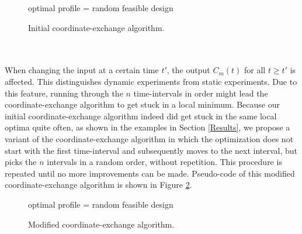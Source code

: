 \begin{figure}
	
	\begin{algorithm}[H]
		optimal profile = random feasible design\;
		
	\end{algorithm}
	
	\caption{Initial coordinate-exchange algorithm.}
	\label{pseudo1}
\end{figure}
\\
\\
When changing the input at a certain time $t'$, the output $C_m(t)$ for all $t\geq t'$ is affected. This distinguishes dynamic experiments from static experiments. Due to this feature, running through the $n$ time-intervals in order might lead the coordinate-exchange algorithm to get stuck in a local minimum. Because our initial coordinate-exchange algorithm indeed did get stuck in the same local optima quite often, as shown in the examples in Section \ref{Results}, we propose a variant of the coordinate-exchange algorithm in which the optimization does not start with the first time-interval and subsequently moves to the next interval, but picks the $n$ intervals in a random order, without repetition. This procedure is repeated until no more improvements can be made. Pseudo-code of this modified coordinate-exchange algorithm is shown in Figure \ref{pseudo2}.
\begin{figure}
	\begin{algorithm}[H]
		optimal profile = random feasible design\;
	\end{algorithm}
	\caption{Modified coordinate-exchange algorithm.}
	\label{pseudo2}
\end{figure}

